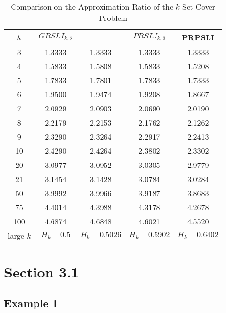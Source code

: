\documentclass[runningheads,a4paper]{llncs}
\numberwithin{equation}{section}
\begin{document}
\begin{table}
\caption{Comparison on the Approximation Ratio of the $k$-Set Cover Problem}
\begin{center}
\begin{tabular}{|c|c|c|c|c|}

  \hline
$k$ & $GRSLI_{k,5}$\cite{furer} & \cite{levin} & $PRSLI_{k,5}$\cite{lp} & PRPSLI \\
  \hline
  3 & 1.3333 & 1.3333 & 1.3333 & 1.3333 \\
  4 & 1.5833 & 1.5808 & 1.5833 & 1.5208 \\
  5 & 1.7833 & 1.7801 & 1.7833 & 1.7333 \\
  6 & 1.9500 & 1.9474 & 1.9208 & 1.8667 \\
  7 & 2.0929 & 2.0903 & 2.0690 & 2.0190 \\
  8 & 2.2179 & 2.2153 & 2.1762 & 2.1262 \\
  9 & 2.3290 & 2.3264 & 2.2917 & 2.2413 \\
  10 & 2.4290 & 2.4264 & 2.3802 & 2.3302 \\
  20 & 3.0977 & 3.0952 & 3.0305 & 2.9779\\
  21 & 3.1454 & 3.1428 & 3.0784 & 3.0284\\
  50 & 3.9992 & 3.9966 & 3.9187 & 3.8683\\
  75 & 4.4014 & 4.3988 & 4.3178 & 4.2678\\
  100 & 4.6874 & 4.6848 & 4.6021 & 4.5520 \\
  \hline
  large $k$ & $H_k-0.5$ & $H_k-0.5026$ & $H_k-0.5902$ & $H_k-0.6402$ \\
  \hline
\end{tabular}
\end{center}
\end{table}


\section{Section 3.1}

\subsection{Example 1}
\end{document}
